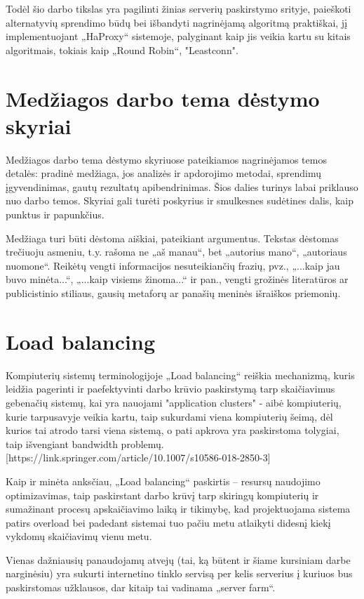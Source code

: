 \documentclass{VUMIFPSkursinis}
\begin{document}
	Todėl šio darbo tikslas yra pagilinti žinias serverių paskirstymo srityje, paieškoti alternatyvių sprendimo būdų bei išbandyti nagrinėjamą algoritmą praktiškai, jį implementuojant „HaProxy“ sistemoje, palyginant kaip jis veikia kartu su kitais algoritmais, tokiais kaip „Round Robin“, "Leastconn".

\section{Medžiagos darbo tema dėstymo skyriai}
Medžiagos darbo tema dėstymo skyriuose pateikiamos nagrinėjamos temos detalės:
pradinė medžiaga, jos analizės ir apdorojimo metodai, sprendimų įgyvendinimas,
gautų rezultatų apibendrinimas. Šios dalies turinys labai priklauso nuo darbo
temos. Skyriai gali turėti poskyrius ir smulkesnes sudėtines dalis, kaip
punktus ir papunkčius.

Medžiaga turi būti dėstoma aiškiai, pateikiant argumentus. Tekstas dėstomas
trečiuoju asmeniu, t.y. rašoma ne „aš manau“, bet „autorius mano“, „autoriaus
nuomone“. Reikėtų vengti informacijos nesuteikiančių frazių, pvz., „...kaip jau
buvo minėta...“, „...kaip visiems žinoma...“ ir pan., vengti grožinės literatūros
ar publicistinio stiliaus, gausių metaforų ar panašių meninės išraiškos
priemonių.


\section{Load balancing}
Kompiuterių sistemų terminologijoje „Load balancing“ reiškia mechanizmą, kuris leidžia pagerinti ir paefektyvinti darbo krūvio paskirstymą tarp skaičiavimus gebenačių sistemų, kai yra nauojami "application clusters" - aibė kompiuterių, kurie tarpusavyje veikia kartu, taip sukurdami viena kompiuterių šeimą, dėl kurios tai atrodo tarsi viena sistemą, o pati apkrova yra paskirstoma tolygiai, taip išvengiant bandwidth problemų.[https://link.springer.com/article/10.1007/s10586-018-2850-3]

Kaip ir minėta anksčiau, „Load balancing“ paskirtis – resursų naudojimo optimizavimas, taip paskirstant darbo krūvį tarp skiringų kompiuterių ir sumažinant procesų apskaičiavimo laiką ir tikimybę, kad projektuojama sistema patirs overload bei padedant sistemai tuo pačiu metu atlaikyti didesnį kiekį vykdomų skaičiavimų vienu metu.

Vienas dažniausių panaudojamų atvejų (tai, ką būtent ir šiame kursiniam darbe narginėsiu) yra sukurti internetino tinklo servisą per kelis serverius į kuriuos bus paskirstomas užklausos, dar kitaip tai vadinama „server farm“.
\end{document}

